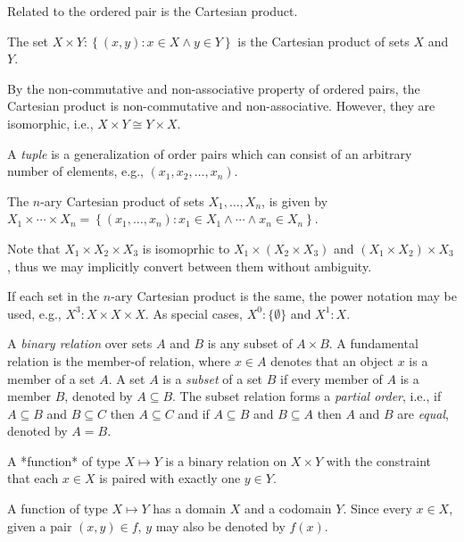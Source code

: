 \documentclass[
]{article}
\begin{document}
Related to the ordered pair is the Cartesian product.

\begin{definition}
    The set $X \times Y : \left\{(x,y) : x \in 
    X \land y \in Y\right\}$ is the Cartesian product of sets $X$ 
    and $Y$.
\end{definition}

By the non-commutative and non-associative property of ordered pairs,
the Cartesian product is non-commutative and non-associative. However,
they are isomorphic, i.e., \(X \times Y \cong Y \times X\).

A \emph{tuple} is a generalization of order pairs which can consist of
an arbitrary number of elements, e.g., \((x_1,x_2,\ldots,x_n)\).

\begin{definition}
    The $n$-ary Cartesian product of sets $X_1,\ldots,X_n$, is given by $X_1 \times \cdots \times X_n = \left\{(x_1,\ldots,x_n) : x_1 \in X_1 \land \cdots \land x_n \in X_n\right\}$.
\end{definition}

Note that \(X_1 \times X_2 \times X_3\) is isomoprhic to
\(X_1 \times \left(X_2 \times X_3\right)\) and
\(\left(X_1 \times X_2\right) \times X_3\), thus we may implicitly
convert between them without ambiguity.

If each set in the \(n\)-ary Cartesian product is the same, the power
notation may be used, e.g., \(X^3 : X \times X \times X\). As special
cases, \(X^0 : \{ \emptyset \}\) and \(X^1 : X\).

A \emph{binary relation} over sets \(A\) and \(B\) is any subset of
\(A \times B\). A fundamental relation is the member-of relation, where
\(x \in A\) denotes that an object \(x\) is a member of a set \(A\). A
set \(A\) is a \emph{subset} of a set \(B\) if every member of \(A\) is
a member \(B\), denoted by \(A \subseteq B\). The subset relation forms
a \emph{partial order}, i.e., if \(A \subseteq B\) and \(B \subseteq C\)
then \(A \subseteq C\) and if \(A \subseteq B\) and \(B \subseteq A\)
then \(A\) and \(B\) are \emph{equal}, denoted by \(A = B\).

\begin{definition}
    A *function* of type $X \mapsto Y$ is a binary relation on $X \times Y$ with the constraint that each $x \in X$ is paired with exactly one $y \in Y$.
\end{definition}

A function of type \(X \mapsto Y\) has a domain \(X\) and a codomain
\(Y\). Since every \(x \in X\), given a pair \((x,y) \in f\), \(y\) may
also be denoted by \(f(x)\).
\end{document}
